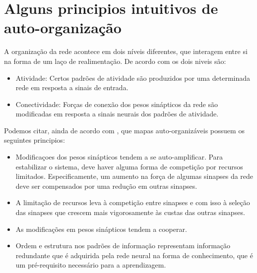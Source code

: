 \section { Alguns principios intuitivos de auto-organização}
\quad A organização da rede acontece em dois níveis diferentes, que interagem entre si na forma de um laço de realimentação.  De acordo com \cite{hay} os dois niveis são:
\begin{itemize}
\item  Atividade: Certos padrões de atividade são produzidos por uma determinada rede em resposta a sinais de entrada.
\item Conectividade: Forças de conexão dos pesos sinápticos da rede  são modificadas em resposta a sinais neurais dos padrões de atividade. 
\end{itemize}

Podemos citar, ainda de acordo com \cite{hay}, que mapas auto-organizáveis possuem os seguintes principios:
\begin{itemize}
\item  Modificaçoes dos pesos  sinápticos tendem a se auto-amplificar. Para estabilizar o sistema, deve haver alguma forma de competição por recursos limitados. Especificamente, um aumento na força de algumas sinapses da rede deve ser compensados por uma redução em outras sinapses.
\item  A limitação de recursos leva à competição entre sinapses e com isso à seleção das sinapses  que crescem mais vigorosamente  às custas das outras sinapses.
\item As modificações em pesos sinápticos tendem a cooperar.
\item Ordem e estrutura nos padrões de informação representam informação redundante que é adquirida pela rede neural na forma de conhecimento, que é um pré-requisito necessário para a aprendizagem.
\end{itemize}

